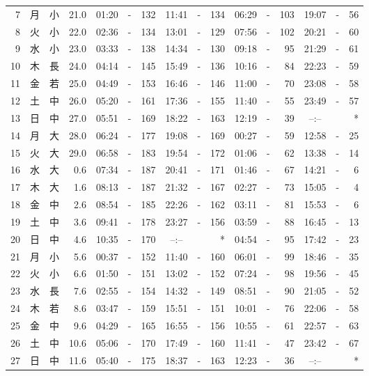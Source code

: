 \documentclass[12pt.a4j]{jsarticle}
\begin{document}
\begin{center}
\begin{table}[ht]
\begin{tabular}{|rc|cr|ccrccr|ccrccr|}
 7 & 月 & 小 & 21.0 & 01:20 &-& 132 & 11:41 &-& 134 & 06:29 &-& 103 & 19:07 &-&  56 \\
 8 & 火 & 小 & 22.0 & 02:36 &-& 134 & 13:01 &-& 129 & 07:56 &-& 102 & 20:21 &-&  60 \\
 9 & 水 & 小 & 23.0 & 03:33 &-& 138 & 14:34 &-& 130 & 09:18 &-&  95 & 21:29 &-&  61 \\
10 & 木 & 長 & 24.0 & 04:14 &-& 145 & 15:49 &-& 136 & 10:16 &-&  84 & 22:23 &-&  59 \\
11 & 金 & 若 & 25.0 & 04:49 &-& 153 & 16:46 &-& 146 & 11:00 &-&  70 & 23:08 &-&  58 \\
12 & 土 & 中 & 26.0 & 05:20 &-& 161 & 17:36 &-& 155 & 11:40 &-&  55 & 23:49 &-&  57 \\
13 & 日 & 中 & 27.0 & 05:51 &-& 169 & 18:22 &-& 163 & 12:19 &-&  39 & --:-- & &  *  \\
14 & 月 & 大 & 28.0 & 06:24 &-& 177 & 19:08 &-& 169 & 00:27 &-&  59 & 12:58 &-&  25 \\
15 & 火 & 大 & 29.0 & 06:58 &-& 183 & 19:54 &-& 172 & 01:06 &-&  62 & 13:38 &-&  14 \\
16 & 水 & 大 &  0.6 & 07:34 &-& 187 & 20:41 &-& 171 & 01:46 &-&  67 & 14:21 &-&   6 \\
17 & 木 & 大 &  1.6 & 08:13 &-& 187 & 21:32 &-& 167 & 02:27 &-&  73 & 15:05 &-&   4 \\
18 & 金 & 中 &  2.6 & 08:54 &-& 185 & 22:26 &-& 162 & 03:11 &-&  81 & 15:53 &-&   6 \\
19 & 土 & 中 &  3.6 & 09:41 &-& 178 & 23:27 &-& 156 & 03:59 &-&  88 & 16:45 &-&  13 \\
20 & 日 & 中 &  4.6 & 10:35 &-& 170 & --:-- & &  *  & 04:54 &-&  95 & 17:42 &-&  23 \\
21 & 月 & 小 &  5.6 & 00:37 &-& 152 & 11:40 &-& 160 & 06:01 &-&  99 & 18:46 &-&  35 \\
22 & 火 & 小 &  6.6 & 01:50 &-& 151 & 13:02 &-& 152 & 07:24 &-&  98 & 19:56 &-&  45 \\
23 & 水 & 長 &  7.6 & 02:55 &-& 154 & 14:32 &-& 149 & 08:51 &-&  90 & 21:05 &-&  52 \\
24 & 木 & 若 &  8.6 & 03:47 &-& 159 & 15:51 &-& 151 & 10:01 &-&  76 & 22:06 &-&  58 \\
25 & 金 & 中 &  9.6 & 04:29 &-& 165 & 16:55 &-& 156 & 10:55 &-&  61 & 22:57 &-&  63 \\
26 & 土 & 中 & 10.6 & 05:06 &-& 170 & 17:49 &-& 160 & 11:41 &-&  47 & 23:42 &-&  67 \\
27 & 日 & 中 & 11.6 & 05:40 &-& 175 & 18:37 &-& 163 & 12:23 &-&  36 & --:-- & &  *  \\

\end{tabular}
\end{table}
\end{center}
\end{document}
